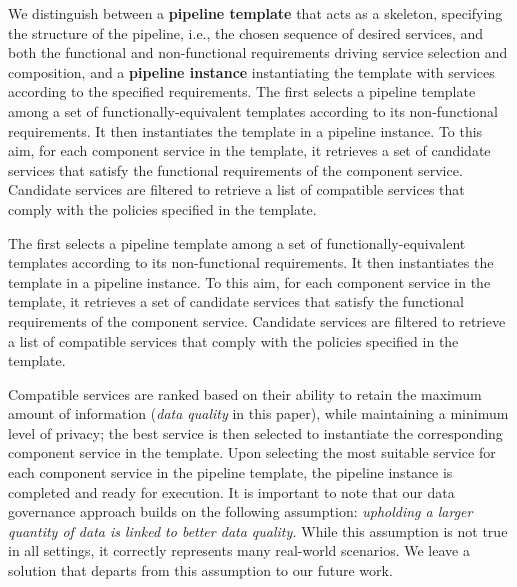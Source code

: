 We distinguish between a \textbf{pipeline template} that acts as a skeleton, specifying the structure of the pipeline, i.e., the chosen sequence of desired services, and both the functional and non-functional requirements driving service selection and composition, and a \textbf{pipeline instance} instantiating the template with services according to the specified requirements.
The \user first selects a pipeline template among a set of functionally-equivalent templates according to its non-functional requirements. It then instantiates the template in a pipeline instance. To this aim, for each component service in the template, it retrieves a set of candidate services that satisfy the functional requirements of the component service. Candidate services are filtered to retrieve a list of compatible services that comply with the  policies specified in the template.

The \user first selects a pipeline template among a set of functionally-equivalent templates according to its non-functional requirements. It then instantiates the template in a pipeline instance. To this aim, for each component service in the template, it retrieves a set of candidate services that satisfy the functional requirements of the component service. Candidate services are filtered to retrieve a list of compatible services that comply with the  policies specified in the template.

Compatible services are ranked based on their ability to retain the maximum amount of information (\emph{data quality} in this paper), while maintaining a minimum level of privacy; the best service is then selected to instantiate the corresponding component service in the template.
Upon selecting the most suitable service for each component service in the pipeline template, the pipeline instance is completed and ready for execution.
It is important to note that our data governance approach builds on the following assumption: \emph{upholding a larger quantity of data is linked to better data quality.}
While this assumption is not true in all settings, it correctly represents many real-world scenarios. We leave a solution that departs from this assumption to our future work.

